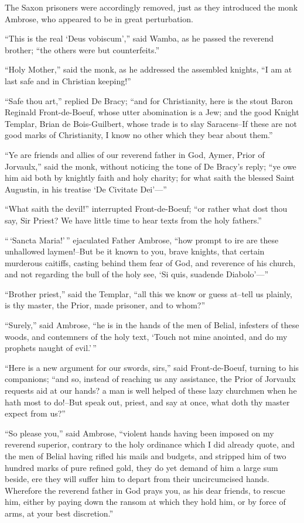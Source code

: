 The Saxon prisoners were accordingly removed, just as they introduced
the monk Ambrose, who appeared to be in great perturbation.

``This is the real `Deus vobiscum','' said Wamba, as he passed the
reverend brother; ``the others were but counterfeits.''

``Holy Mother,'' said the monk, as he addressed the assembled knights,
``I am at last safe and in Christian keeping!''

``Safe thou art,'' replied De Bracy; ``and for Christianity, here is the
stout Baron Reginald Front-de-Boeuf, whose utter abomination is a Jew;
and the good Knight Templar, Brian de Bois-Guilbert, whose trade is to
slay Saracens--If these are not good marks of Christianity, I know no
other which they bear about them.''

``Ye are friends and allies of our reverend father in God, Aymer, Prior
of Jorvaulx,'' said the monk, without noticing the tone of De Bracy's
reply; ``ye owe him aid both by knightly faith and holy charity; for
what saith the blessed Saint Augustin, in his treatise `De Civitate
Dei'---''

``What saith the devil!'' interrupted Front-de-Boeuf; ``or rather what
dost thou say, Sir Priest? We have little time to hear texts from the
holy fathers.''

``\,`Sancta Maria!'\,'' ejaculated Father Ambrose, ``how prompt to ire
are these unhallowed laymen!--But be it known to you, brave knights,
that certain murderous caitiffs, casting behind them fear of God, and
reverence of his church, and not regarding the bull of the holy see, `Si
quis, suadende Diabolo'---''

``Brother priest,'' said the Templar, ``all this we know or guess
at--tell us plainly, is thy master, the Prior, made prisoner, and to
whom?''

``Surely,'' said Ambrose, ``he is in the hands of the men of Belial,
infesters of these woods, and contemners of the holy text, `Touch not
mine anointed, and do my prophets naught of evil.'\,''

``Here is a new argument for our swords, sirs,'' said Front-de-Boeuf,
turning to his companions; ``and so, instead of reaching us any
assistance, the Prior of Jorvaulx requests aid at our hands? a man is
well helped of these lazy churchmen when he hath most to do!--But speak
out, priest, and say at once, what doth thy master expect from us?''

``So please you,'' said Ambrose, ``violent hands having been imposed on
my reverend superior, contrary to the holy ordinance which I did already
quote, and the men of Belial having rifled his mails and budgets, and
stripped him of two hundred marks of pure refined gold, they do yet
demand of him a large sum beside, ere they will suffer him to depart
from their uncircumcised hands. Wherefore the reverend father in God
prays you, as his dear friends, to rescue him, either by paying down the
ransom at which they hold him, or by force of arms, at your best
discretion.''

